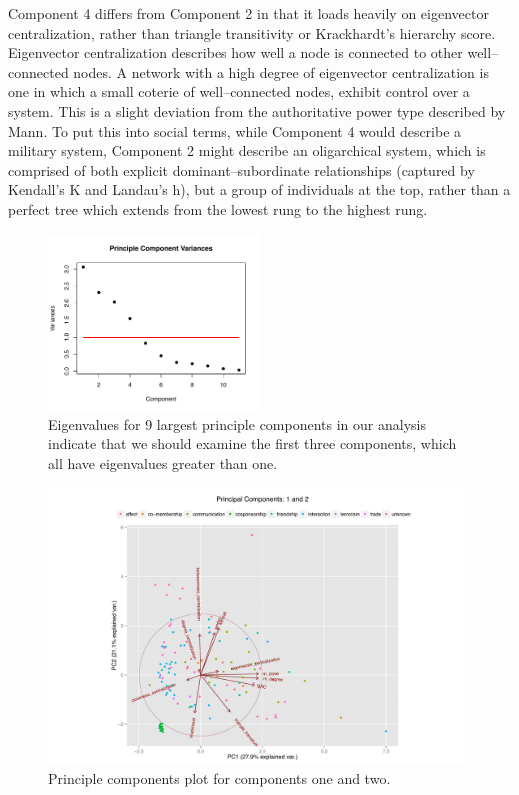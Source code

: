 \documentclass[3p,times]{elsarticle}
\begin{document}
Component 4 differs from Component 2 in that it loads heavily on eigenvector centralization, rather than triangle transitivity or Krackhardt's hierarchy score. Eigenvector centralization describes how well a node is connected to other well--connected nodes. A network with a high degree of eigenvector centralization is one in which a small coterie of well--connected nodes, exhibit control over a system. This is a slight deviation from the authoritative power type described by Mann. To put this into social terms, while Component 4 would describe a military system, Component 2 might describe an oligarchical system, which is comprised of both explicit dominant--subordinate relationships (captured by Kendall's K and Landau's h), but a group of individuals at the top, rather than a perfect tree which extends from the lowest rung to the highest rung.

\begin{figure}
\begin{center}
	\caption{\label{fig:PCA variacnes} Eigenvalues for 9 largest principle components in our analysis indicate that we should examine the first three components, which all have eigenvalues greater than one.}
		\includegraphics[width = 0.5\textwidth]{./images/Observed_PCA_Component_Varinces.pdf}
\end{center}
\end{figure}

\begin{figure}
\begin{center}
	\caption{\label{fig:1 and 2} Principle components plot for components one and two.}
		\includegraphics[width = 0.98\textwidth]{./images/Observed_PCA_Components1_2.pdf}
\end{center}
\end{figure}
\end{document}
